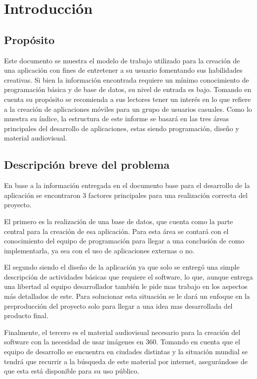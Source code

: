 \section{Introducción}
\subsection{Propósito}
Este documento se muestra el modelo de trabajo utilizado para la creación de una aplicación con fines de entretener a su usuario fomentando sus habilidades creativas. Si bien la información encontrada requiere un mínimo conocimiento de programación básica y de base de datos, su nivel de entrada es bajo. Tomando en cuenta su propósito se recomienda a sus lectores tener un interés en lo que refiere a la creación de aplicaciones móviles para un grupo de usuarios casuales. Como lo muestra su índice, la estructura de este informe se basará en las tres áreas principales del desarrollo de aplicaciones, estas siendo programación, diseño y material audiovisual.
\subsection{Descripción breve del problema}
En base a la información entregada en el documento base para el desarrollo de la aplicación se encontraron 3 factores principales para una realización correcta del proyecto. 

El primero es la realización de una base de datos, que cuenta como la parte central para la creación de esa aplicación. Para esta área se contará con el conocimiento del equipo de programación para llegar a una conclusión de como implementarla, ya sea con el uso de aplicaciones externas o no.

 El segundo siendo el diseño de la aplicación ya que solo se entregó una simple descripción de actividades básicas que requiere el software, lo que, aunque entrega una libertad al equipo desarrollador también le pide mas trabajo en los aspectos más detallados de este. Para solucionar esta situación se le dará un enfoque en la preproducción del proyecto solo para llegar a una idea mas desarrollada del producto final.
 
Finalmente, el tercero es el material audiovisual necesario para la creación del software con la necesidad de usar imágenes en 360. Tomando en cuenta que el equipo de desarrollo se encuentra en ciudades distintas y la situación mundial se tendrá que recurrir a la búsqueda de este material por internet, asegurándose de que esta está disponible para su uso público.
